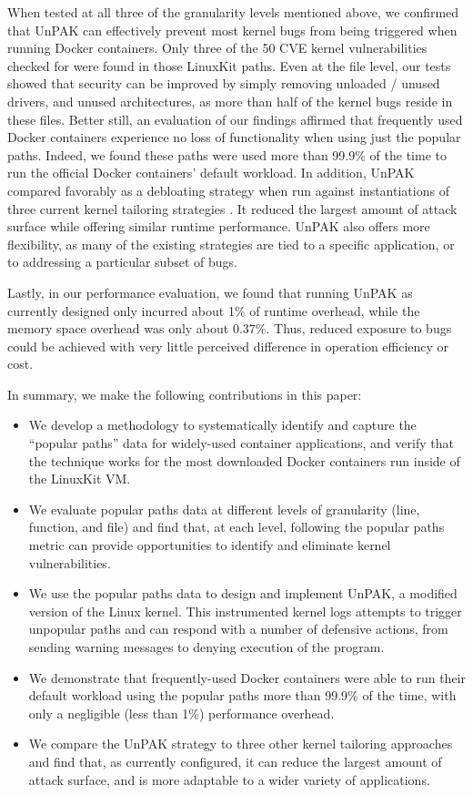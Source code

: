 When tested at all three of the granularity levels mentioned above, we confirmed that UnPAK can effectively prevent most kernel bugs from being triggered when running Docker containers. 
Only three of the 50 CVE kernel vulnerabilities checked for were found in those LinuxKit paths. 
Even at the file level, our tests showed that security can be improved by simply removing unloaded / unused drivers, and unused architectures, 
as more than half of the kernel bugs reside in these files. 
Better still, an evaluation of our findings affirmed that frequently used Docker containers experience no loss of functionality when using just the popular paths. 
Indeed, we found these paths were used more than 99.9\% of the time to run the official Docker containers' default workload. 
In addition, UnPAK compared favorably as a debloating strategy when run against instantiations of three current kernel tailoring strategies \cite{SALAD18, NDSS13, Linux-Kernel-Tailoring-Framework}. 
It reduced the largest amount of attack surface while offering similar runtime performance. 
UnPAK also offers more flexibility, as many of the existing strategies are tied to a specific application, or to addressing a particular subset of bugs.

Lastly, in our performance evaluation, we found that running UnPAK as currently designed only incurred about 1\% of runtime overhead, 
while the memory space overhead was only about 0.37\%. 
Thus, reduced exposure to bugs could be achieved with very little perceived difference in operation efficiency or cost.

In summary, we make the following contributions in this paper:
\begin{itemize}
	\item We develop a methodology to systematically identify and capture the ``popular paths'' data for widely-used container applications, and verify that the technique works for the most downloaded Docker containers run inside of the LinuxKit VM.  
	\item We evaluate popular paths data at different levels of granularity (line, function, and file) and find that, at each level, following the popular paths metric can provide opportunities to identify and eliminate kernel vulnerabilities.
	\item We use the popular paths data to design and implement UnPAK, a modified version of the Linux kernel. This instrumented kernel logs attempts to trigger unpopular paths and can respond with a number of defensive actions, from sending warning messages to denying execution of the program.
	\item We demonstrate that frequently-used Docker containers were able to run their default workload using the popular paths more than 99.9\% of the time, with only a negligible (less than 1\%) performance overhead. 
	\item We compare the UnPAK strategy to three other kernel tailoring approaches and find that, as currently configured, it can reduce the largest amount of attack surface, and is more adaptable to a wider variety of applications.
\end{itemize}